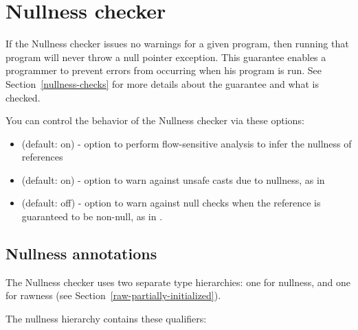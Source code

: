 \htmlhr
\section{Nullness checker\label{nullness-checker}}

If the Nullness checker issues no warnings for a given program, then
running that program will never throw a null pointer exception.  This
guarantee enables a programmer to prevent errors from occurring when his
program is run.  See Section~\ref{nullness-checks} for more details about
the guarantee and what is checked.


You can control the behavior of the Nullness checker via these 
options:

\begin{itemize}

\item
   (default: on) - option to perform flow-sensitive
  analysis to infer the nullness of references

\item
   (default: on) - option to warn against unsafe casts due to
  nullness, as in 

\item
   (default: off) - option to warn against null checks when
  the reference is guaranteed to be non-null, as in .

\end{itemize}


\subsection{Nullness annotations\label{nullness-annotations}}

The Nullness checker uses two separate type hierarchies:  one for nullness,
and one for rawness (see Section~\ref{raw-partially-initialized}).

The nullness hierarchy contains these qualifiers:

